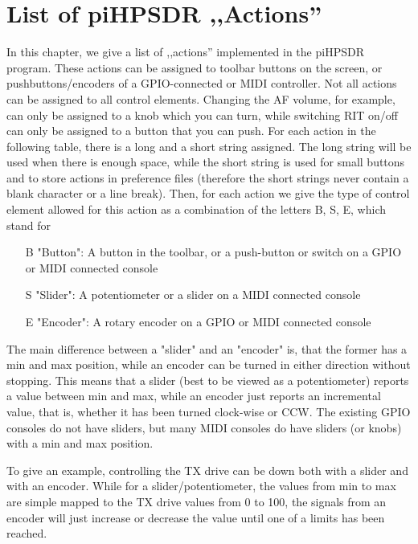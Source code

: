 \documentclass[12pt]{book}
\begin{document}
\chapter{List of piHPSDR ,,Actions''}

In this chapter, we give a list of ,,actions'' implemented in the piHPSDR program. These actions can be assigned to
toolbar buttons on the screen, or pushbuttons/encoders of a GPIO-connected or MIDI controller. Not all actions can
be assigned to all control elements. Changing the AF volume, for example, can only be assigned to a knob which
you can turn, while switching RIT on/off can only be assigned to a button that you can push. For each action
in the following table, there is a long and a short string assigned. The long string will be used when there is
enough space, while the short string is used for small buttons and to store actions in preference files (therefore
the short strings never contain a blank character or a line break). Then, for each action we give the type of control
element allowed for this action as a combination of the letters B, S, E, which stand for

\begin{itemize}[font=\texttt, left=0pt]
\item[B] {"Button": A button in the toolbar, or a push-button or switch on a GPIO or MIDI connected console}
\item[S] {"Slider": A potentiometer or a slider on a MIDI connected console}
\item[E] {"Encoder": A rotary encoder on a GPIO or MIDI connected console}
\end{itemize}

The main difference between a "slider" and an "encoder" is, that the former has a min and max position, while
an encoder can be turned in either direction without stopping. This means that a slider (best to be viewed
as a potentiometer) reports a value between min and max, while an encoder just reports an incremental value,
that is, whether it has been turned clock-wise or CCW. The existing GPIO consoles do not have  sliders, but
many MIDI consoles do have sliders (or knobs) with a min and max position.

To give an example, controlling the TX drive can be down both with a slider and with an encoder. While for
a slider/potentiometer, the values from min to max are simple mapped to the TX drive values from 0 to 100,
the signals from an encoder will just increase or decrease the value until one of a limits has been reached.
\end{document}
